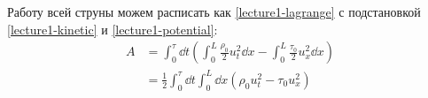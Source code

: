 Работу всей струны можем расписать как \eqref{lecture1-lagrange} с подстановкой \eqref{lecture1-kinetic} и \eqref{lecture1-potential}:
%
\begin{equation}
  \begin{aligned}
    A &= \int_0^\tau \dd t \left(\int_0^L \frac{\rho_0}{2} u_t^2 \dd x - \int_0^L \frac{\tau_0}{2} u_x^2 \dd x \right) \\
    &= \frac{1}{2} \int_0^\tau \dd t \int_0^L \dd x \left(\rho_0 u_t^2 - \tau_0 u_x^2 \right)
  \end{aligned}
  \label{lecture1-wave-functional}
\end{equation}